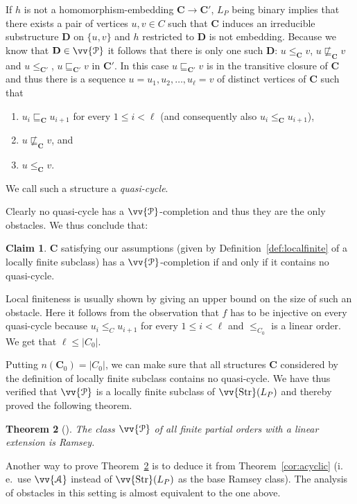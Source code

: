\documentclass{elsarticle}
\newcommand{\ie}{i.\,e.}
\def\Str{\mathop{\mathrm{Str}}\nolimits}
\def\ordclass#1{\vv{#1}}
\def\str#1{\mathbf {#1}}
\theoremstyle{plain}
\newtheorem{theorem}{Theorem}[section]
\theoremstyle{definition}
\newtheorem{claim}[theorem]{Claim}
\theoremstyle{remark}
\begin{document}
If $h$ is not a homomorphism-embedding $\str{C}\to\str{C}'$, $L_P$ being binary implies that there exists a pair of vertices $u, v\in C$ such that $\str{C}$ induces an irreducible
substructure $\str{D}$ on $\{u,v\}$ and $h$ restricted to $\str{D}$ is not embedding.  Because we know that $\str{D}\in \ordclass{\mathcal P}$ it follows that there is only one such $\str D$: $u \leq_\str{C} v$, $u \not\sqsubseteq_\str{C} v$ and $u \leq_{\str{C}'}$, $u \sqsubseteq_{\str{C}'} v$ in $\str{C}'$.
In this case $u \sqsubseteq_{\str{C}'} v$ is in the transitive closure of $\str{C}$ and thus there is a 
sequence $u=u_1,u_2,\ldots, u_\ell=v$ of distinct vertices of $\str{C}$ such that
\begin{enumerate}
\item $u_i\sqsubseteq_\str{C} u_{i+1}$ for every $1\leq i<\ell$ (and consequently also $u_i\leq_\str{C} u_{i+1}$),
\item $u \not\sqsubseteq_\str{C} v$, and
\item $u \leq_\str C v$.
\end{enumerate} We call such a structure a \emph{quasi-cycle}.

Clearly no quasi-cycle has a $\ordclass{\mathcal P}$-completion and thus they
are the only obstacles. We thus conclude that:
\begin{claim}
$\str{C}$ satisfying our assumptions (given by Definition~\ref{def:localfinite} of a locally finite subclass) has a $\ordclass{\mathcal P}$-completion if and only if it contains no quasi-cycle.
\end{claim}
Local finiteness is usually shown by giving an upper bound on the size of such an obstacle.
Here it follows from the observation
that $f$ has to be injective on every quasi-cycle because 
$u_i \leq_C u_{i+1}$ for every $1\leq i< \ell$ and $\leq_{C_0}$ is a linear order. We get that $\ell\leq |C_0|$.

Putting $n(\str{C}_0)=|C_0|$, we can make sure that all structures $\str{C}$ considered by the definition
of locally finite subclass contains no quasi-cycle.
We have thus verified that $\ordclass{\mathcal P}$ is a locally finite subclass of
$\ordclass{\Str}(L_P)$ and thereby proved the following theorem.

\begin{theorem}[\cite{Nevsetvril1984,Trotter1985}]
\label{thm:posets}
The class $\ordclass{\mathcal P}$ of all finite partial orders with a linear extension is Ramsey.
\end{theorem}
Another way to prove Theorem~\ref{thm:posets}  is to deduce it from Theorem~\ref{cor:acyclic}
(\ie{}\ use $\ordclass{\mathcal A}$ instead of $\ordclass{\Str}(L_P)$ as the base Ramsey class).
The analysis of obstacles in this setting is almost equivalent to the one above.
\end{document}
